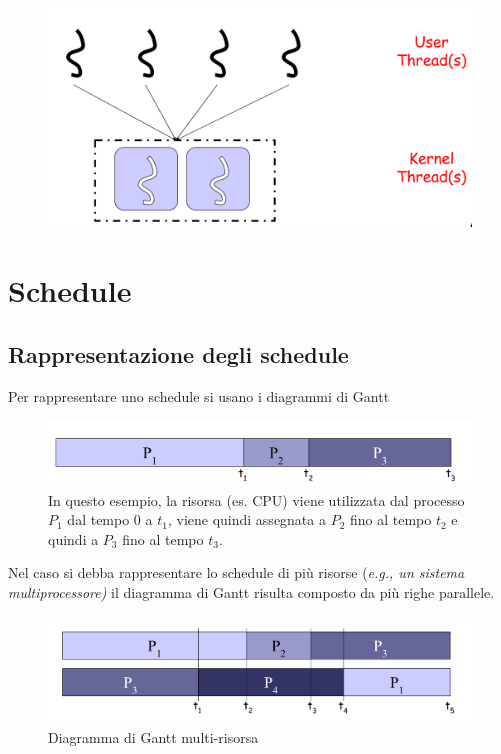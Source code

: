 \begin{figure} [h]
    \centering
    \includegraphics[width=0.5\linewidth]{Images/Screenshot 2024-12-23 at 13-17-03 so-02.1-scheduling - so-02.1-scheduling.pdf.png}
\end{figure}

\section{Schedule}

\subsection{Rappresentazione degli schedule}
Per rappresentare uno schedule si usano i diagrammi di Gantt
\begin{figure} [h]
    \centering
\includegraphics[width=0.5\linewidth]{Images/Screenshot 2024-12-23 at 13-32-35 so-02.1-scheduling - so-02.1-scheduling.pdf.png}
    \caption{In questo esempio, la risorsa (es. CPU) viene utilizzata dal processo $P_1$ dal tempo 0 a $t_1$, viene quindi assegnata a $P_2$ fino al tempo $t_2$ e quindi a $P_3$ fino al tempo $t_3$.}
\end{figure}
\newline

Nel caso si debba rappresentare lo schedule di più risorse (\textit{e.g., un sistema multiprocessore)} il diagramma di Gantt risulta composto da più righe parallele.

\begin{figure} [h]
    \centering
\includegraphics[width=0.5\linewidth]{Images/Screenshot 2024-12-23 at 13-37-03 so-02.1-scheduling - so-02.1-scheduling.pdf.png}
    \caption{Diagramma di Gantt multi-risorsa}
\end{figure}

